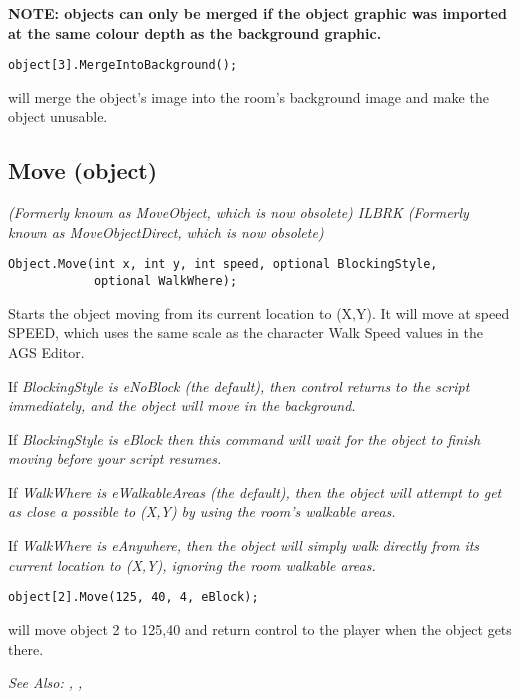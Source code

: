 \bf{NOTE:} objects can only be merged if the object graphic was imported at
the same colour depth as the background graphic.

\begin{verbatim}
object[3].MergeIntoBackground();
\end{verbatim}
will merge the object's image into the room's background image and make the object unusable.


\subsection{Move (object)}\label{Object.Move}%

\it{(Formerly known as MoveObject, which is now obsolete)} ILBRK
\it{(Formerly known as MoveObjectDirect, which is now obsolete)}

\begin{verbatim}
Object.Move(int x, int y, int speed, optional BlockingStyle,
            optional WalkWhere);
\end{verbatim}
Starts the object moving from its current location to (X,Y). It will
move at speed SPEED, which uses the same scale as the character Walk Speed
values in the AGS Editor.

If \it{BlockingStyle} is eNoBlock (the default), then control returns to the script
immediately, and the object will move in the background.

If \it{BlockingStyle} is eBlock then this command will wait for the object
to finish moving before your script resumes.

If \it{WalkWhere} is eWalkableAreas (the default), then the object will attempt to
get as close a possible to (X,Y) by using the room's walkable areas.

If \it{WalkWhere} is eAnywhere, then the object will simply walk directly from its
current location to (X,Y), ignoring the room walkable areas.

\begin{verbatim}
object[2].Move(125, 40, 4, eBlock);
\end{verbatim}
will move object 2 to 125,40 and return control to the player when the object gets there.

\it{See Also:} , ,



